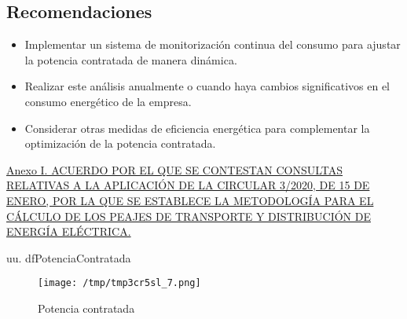 \documentclass[a4paper,10pt,twocolumn]{article}
\begin{document}
\begin{Form}
\section{Recomendaciones}
\begin{itemize}
    \item Implementar un sistema de monitorización continua del consumo para ajustar la potencia contratada de manera dinámica.
    \item Realizar este análisis anualmente o cuando haya cambios significativos en el consumo energético de la empresa.
    \item Considerar otras medidas de eficiencia energética para complementar la optimización de la potencia contratada.
\end{itemize}
















\begin{thebibliography}{99}


\href{}
{}


\href{https://www.cnmc.es/sites/default/files/3416756_135.pdf}
{Anexo I. ACUERDO POR EL QUE SE CONTESTAN CONSULTAS RELATIVAS A LA
APLICACIÓN DE LA CIRCULAR 3/2020, DE 15 DE ENERO, POR LA QUE SE
ESTABLECE LA METODOLOGÍA PARA EL CÁLCULO DE LOS PEAJES DE
TRANSPORTE Y DISTRIBUCIÓN DE ENERGÍA ELÉCTRICA.}




\end{thebibliography}








\ifdefined\MostrarVariablesAlFinal
\newpage
\onecolumn



uu. dfPotenciaContratada

\begin{figure}[H] \centering
                    
                    \texttt{[image: /tmp/tmp3cr5sl\_7.png]}
                    \caption{Potencia contratada}
                    
                    \label{fig:dfassssdfsa}
                    \end{figure}
                    


\end{Form}
\end{document}
